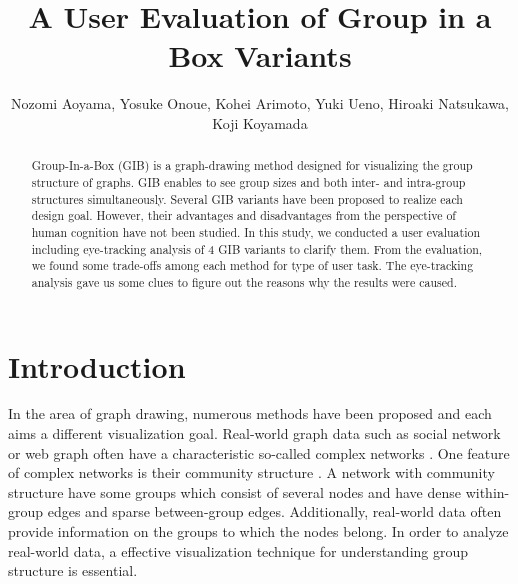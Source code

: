 \documentclass{llncs}
\begin{document}

\title{A User Evaluation of Group in a Box Variants}
%
%
\author{Nozomi Aoyama, Yosuke Onoue, Kohei Arimoto, Yuki Ueno, Hiroaki Natsukawa, Koji Koyamada}
%
%
%

\maketitle              %

\begin{abstract}
Group-In-a-Box (GIB) is a graph-drawing method designed for visualizing the group structure of graphs.
GIB enables to see group sizes and both inter- and intra-group structures simultaneously.
Several GIB variants have been proposed to realize each design goal.
However, their advantages and disadvantages from the perspective of human cognition have not been studied.
In this study, we conducted a user evaluation including eye-tracking analysis of 4 GIB variants to clarify them.
From the evaluation, we found some trade-offs among each method for type of user task.
The eye-tracking analysis gave us some clues to figure out the reasons why the results were caused.

\end{abstract}

%
\section{Introduction}
%
In the area of graph drawing, numerous methods have been proposed and each aims a different visualization goal.
Real-world graph data such as social network or web graph often have a characteristic so-called complex networks \cite{newman10}.
One feature of complex networks is their community structure \cite{newman02,newman04}.
A network with community structure have some groups which consist of several nodes and have dense within-group edges and sparse between-group edges.
Additionally, real-world data often provide information on the groups to which the nodes belong.
In order to analyze real-world data, a effective visualization technique for understanding group structure is essential.
\end{document}
